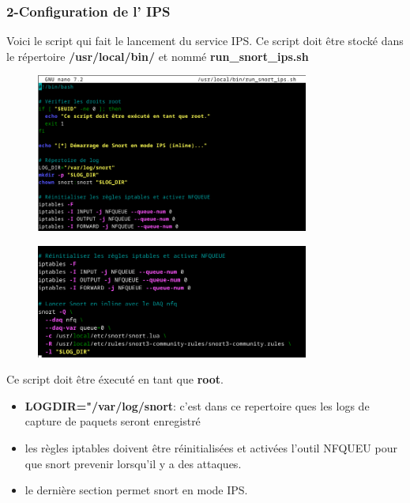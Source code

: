 \documentclass[12pt]{article}
\begin{document}
\subsubsection*{2-Configuration de l' IPS}
Voici le script qui fait le lancement du service IPS. Ce script doit être stocké dans le répertoire \textbf{/usr/local/bin/} et nommé \textbf{run\_snort\_ips.sh}
\begin{figure}[H] 
    \centering
    \includegraphics[width=0.8\textwidth]{captures/image4.png}
    \label{fig:mon_image}
\end{figure}
\begin{figure}[H] %
    \centering
    \includegraphics[width=0.8\textwidth]{captures/image5.png}
    \label{fig:mon_image}
\end{figure}
Ce script doit être éxecuté en tant que \textbf{root}.\\
\begin{itemize}
    \item \textbf{LOGDIR="/var/log/snort}: c'est dans ce repertoire ques les logs de capture de paquets seront enregistré
    \item les règles iptables doivent être réinitialisées et activées l'outil NFQUEU pour que snort prevenir lorsqu'il y a des attaques.

    \item le dernière section permet snort en mode IPS.
\end{itemize}
\end{document}
